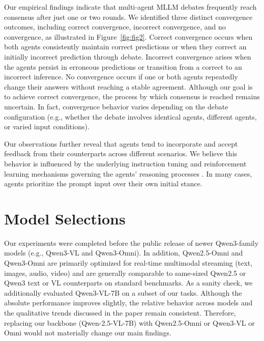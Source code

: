 \documentclass[11pt]{article}
\newcommand{\Qwenname}{Qwen-2.5-VL-7B}
\begin{document}
Our empirical findings indicate that multi-agent MLLM debates frequently reach consensus after just one or two rounds. We identified three distinct convergence outcomes, including correct convergence, incorrect convergence, and no convergence, as illustrated in Figure~\ref{fig:fig2}. Correct convergence occurs when both agents consistently maintain correct predictions or when they correct an initially incorrect prediction through debate. Incorrect convergence arises when the agents persist in erroneous predictions or transition from a correct to an incorrect inference. No convergence occurs if one or both agents repeatedly change their answers without reaching a stable agreement. Although our goal is to achieve correct convergence, the process by which consensus is reached remains uncertain. In fact, convergence behavior varies depending on the debate configuration (e.g., whether the debate involves identical agents, different agents, or varied input conditions).

Our observations further reveal that agents tend to incorporate and accept feedback from their counterparts across different scenarios. We believe this behavior is influenced by the underlying instruction tuning and reinforcement learning mechanisms governing the agents' reasoning processes \citep{ouyang2022training}. In many cases, agents prioritize the prompt input over their own initial stance.



\section{Model Selections}
Our experiments were completed before the public release of newer Qwen3-family models (e.g., Qwen3-VL and Qwen3-Omni). In addition, Qwen2.5-Omni and Qwen3-Omni are primarily optimized for real-time multimodal streaming (text, images, audio, video) and are generally comparable to same-sized Qwen2.5 or Qwen3 text or VL counterparts on standard benchmarks. As a sanity check, we additionally evaluated Qwen3-VL-7B on a subset of our tasks. Although the absolute performance improves slightly, the relative behavior across models and the qualitative trends discussed in the paper remain consistent. Therefore, replacing our backbone (\Qwenname) with Qwen2.5-Omni or Qwen3-VL or Omni would not materially change our main findings.
\end{document}
